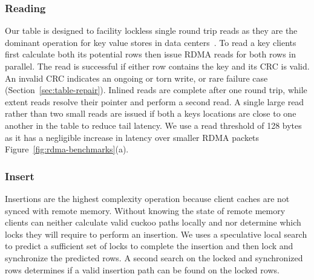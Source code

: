 \subsubsection{Reading} 
\label{sec:reading}

Our table is designed to facility lockless single round trip
reads as they are the dominant operation for key value
stores in data centers~\cite{facebook-memcached}. To read a
key clients first calculate both its potential rows then
issue RDMA reads for both rows in parallel. The read is
successful if either row contains the key and its CRC is
valid. An invalid CRC indicates an ongoing or torn write, or
rare failure case (Section~\ref{sec:table-repair}). Inlined
reads are complete after one round trip, while extent reads
resolve their pointer and perform a second read. A single
large read rather than two small reads are issued if both a
keys locations are close to one another in the table to
reduce tail latency. We use a read threshold of 128 bytes as
it has a negligible increase in latency over smaller RDMA
packets Figure~\ref{fig:rdma-benchmarks}(a). 



\subsubsection{Insert}
\label{sec:insert}

Insertions are the highest complexity operation because
client caches are not synced with remote memory. Without
knowing the state of remote memory clients can neither
calculate valid cuckoo paths locally and nor determine which
locks they will require to perform an insertion. We uses a
speculative local search to predict a sufficient set of
locks to complete the insertion and then lock and
synchronize the predicted rows. A second search on the
locked and synchronized rows determines if a valid insertion
path can be found on the locked rows.

